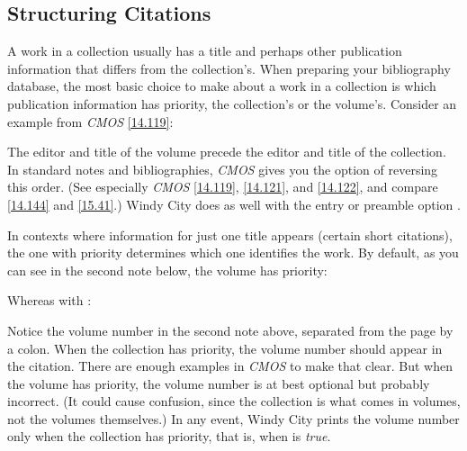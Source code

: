 \documentclass[11pt,letterpaper,oneside]{article}
\begin{document}
\subsection{Structuring Citations}
\label{collorder}

A work in a collection usually has a title and perhaps other
publication information that differs from the collection's. When
preparing your bibliography database, the most basic choice to make
about a work in a collection is which publication information has
priority, the collection's or the volume's. Consider an example from
\textit{CMOS} \ref{14.119}:

\begin{citebib}
\item \cite{armstrong2014}
\end{citebib}

\noindent The editor and title of the volume precede the editor and
title of the collection. In standard notes and bibliographies,
\textit{CMOS} gives you the option of reversing this order. (See
especially \textit{CMOS} \ref{14.119}, \ref{14.121}, and \ref{14.122},
and compare \ref{14.144} and \ref{15.41}.) Windy City does as well
with the entry or preamble option .

\begin{citebib}
\item \cite{armstrong2014}
\end{citebib}

In contexts where information for just one title appears (certain
short citations), the one with priority determines which one
identifies the work. By default, as you can see in the second note
below, the volume has priority:

\begin{citenobib}
\item \cite{armstrong2014}
\item \cite[45]{armstrong2014}
\end{citenobib}

\noindent Whereas with :

\begin{citenobib}
\item \cite{armstrong2014}
\item \cite[45]{armstrong2014}
\end{citenobib}

Notice the volume number in the second note above, separated from the
page by a colon. When the collection has priority, the volume number
should appear in the citation. There are enough examples in
\textit{CMOS} to make that clear. But when the volume has priority,
the volume number is at best optional but probably incorrect. (It
could cause confusion, since the collection is what comes in volumes,
not the volumes themselves.) In any event, Windy City prints the
volume number only when the collection has priority, that is, when
 is \textit{true}.
\end{document}
